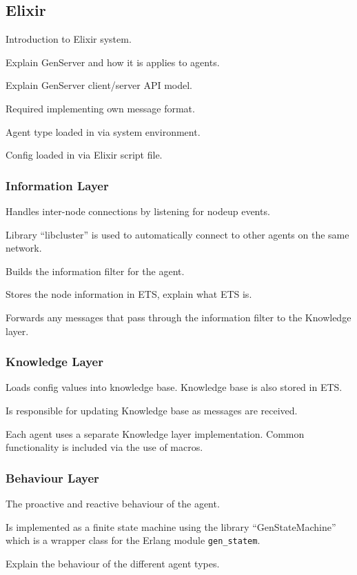 \subsection{Elixir}

Introduction to Elixir system.

Explain GenServer and how it is applies to agents.

Explain GenServer client/server API model.

Required implementing own message format.

Agent type loaded in via system environment.

Config loaded in via Elixir script file.

\subsubsection{Information Layer}

Handles inter-node connections by listening for nodeup events.

Library ``libcluster'' is used to automatically connect to other agents on the same network.

Builds the information filter for the agent.

Stores the node information in ETS, explain what ETS is.

Forwards any messages that pass through the information filter to the Knowledge layer.

\subsubsection{Knowledge Layer}

Loads config values into knowledge base.
Knowledge base is also stored in ETS\@.

Is responsible for updating Knowledge base as messages are received.

Each agent uses a separate Knowledge layer implementation.
Common functionality is included via the use of macros.

\subsubsection{Behaviour Layer}

The proactive and reactive behaviour of the agent.

Is implemented as a finite state machine using the library ``GenStateMachine'' which is a wrapper class for the Erlang module \verb|gen_statem|.

Explain the behaviour of the different agent types.
